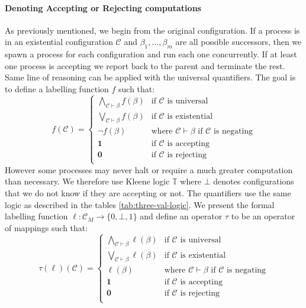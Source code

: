 \paragraph{Denoting Accepting or Rejecting computations}
As previously mentioned, we begin from the original configuration. If a process
is in an existential configuration $\mathcal{C}$ and $\beta_1, ..., \beta_m$ are all
possible successors, then we spawn a process for each configuration and run each one concurrently.
If at least one process is accepting we report back to the parent and terminate the rest. Same line of reasoning can be applied with
the universal quantifiers. The goal is to define a labelling function $f$ such that:
$$
    f(\mathcal{C}) = \begin{cases}
        \bigwedge_{\mathcal{C} \vdash \beta} f(\beta) & \text{if }\mathcal{C} \text{ is universal}                                        \\
        \bigvee_{\mathcal{C} \vdash \beta} f(\beta)   & \text{if }\mathcal{C} \text{ is existential}                                      \\
        \neg f(\beta)                                 & \text{where }\mathcal{C} \vdash \beta \text{ if } \mathcal{C} \text{ is negating} \\
        \mathbf{1}                                    & \text{if } \mathcal{C} \text{ is accepting}                                       \\
        \mathbf{0}                                    & \text{if } \mathcal{C} \text{ is rejecting}                                       \\
    \end{cases}
$$
However some processes may never halt or require a much greater computation than necessary.
We therefore use Kleene logic $\mathbb{T}$ where $\bot$ denotes configurations
that we do not know if they are accepting or not. The quantifiers
use the same logic as described in the tables \ref{tab:three-val-logic}.
We present the formal labelling function $\ell: \mathcal{C}_M \to \{0, \bot ,1\}$
and define an operator $\tau$ to be an operator of mappings such that:
$$
    \tau(\ell)(\mathcal{C}) = \begin{cases}
        \bigwedge_{\mathcal{C} \vdash \beta} \ell(\beta) & \text{if }\mathcal{C} \text{ is universal}                                        \\
        \bigvee_{\mathcal{C} \vdash \beta} \ell(\beta)   & \text{if }\mathcal{C} \text{ is existential}                                      \\
        \ell(\beta)                                      & \text{where }\mathcal{C} \vdash \beta \text{ if } \mathcal{C} \text{ is negating} \\
        \mathbf{1}                                       & \text{if } \mathcal{C} \text{ is accepting}                                       \\
        \mathbf{0}                                       & \text{if } \mathcal{C} \text{ is rejecting}                                       \\
    \end{cases}
$$
